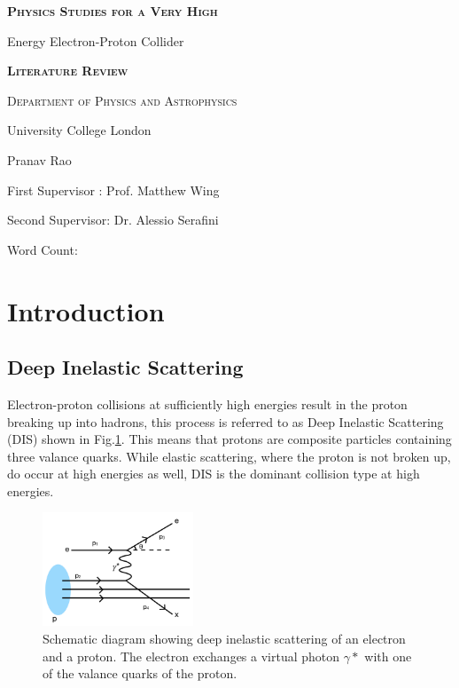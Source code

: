 \documentclass[journal, a4paper,11pt]{IEEEtran}
\begin{document}
\begin{titlepage}
	\centering
    \vspace{2cm}
    {\scshape\LARGE\bfseries Physics Studies for a Very High \par Energy Electron-Proton Collider\par}
    \vspace{2cm}
	{\scshape\Large\bfseries Literature Review\par}
	\vspace{2cm}
	{\scshape\Large Department of Physics and Astrophysics\par University College London\par}
	\vspace{4cm}
	{\huge\bfseries\par}
	{\large Pranav Rao\par}
	{\large First Supervisor : Prof. Matthew Wing\par Second Supervisor: Dr. Alessio Serafini\par}
	\vspace{8cm}
	Word Count: 

	\vfill
\end{titlepage}

    
\justify

\begin{abstract}

\end{abstract}

\section{Introduction}

\subsection*{\textbf{Deep Inelastic Scattering}}

Electron-proton collisions at sufficiently high energies result in the proton breaking up into hadrons, this process is referred to as Deep Inelastic Scattering (DIS) shown in Fig.\ref{fig:DIS}. This means that protons are composite particles containing three valance quarks. While elastic scattering, where the proton is not broken up, do occur at high energies as well, DIS is the dominant collision type at high energies.

\begin{figure}[!h]
	\centering
		\includegraphics[width =0.4\textwidth]{DIS.png}
		\caption{Schematic diagram showing deep inelastic scattering of an electron and a proton. The electron exchanges a virtual photon $\gamma *$ with one of the valance quarks of the proton.}
		\label{fig:DIS}
\end{figure}
\end{document}

